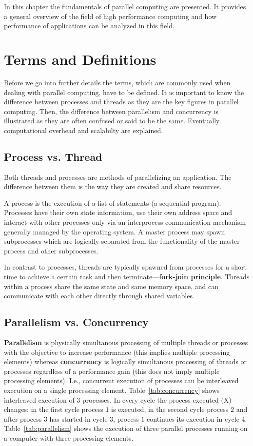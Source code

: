 In this chapter the fundamentals of parallel computing are
presented. It provides a general overview of the field of high
performance computing and how performance of applications can be
analyzed in this field.

\section{Terms and Definitions}
\label{sec:termsdef}

Before we go into further details the terms, which are commonly used
when dealing with parallel computing, have to be
defined. It is important to know the difference between processes
and threads as they are the key figures in parallel computing.
Then, the difference between parallelism and concurrency is illustrated
as they are often confused or said to be the same. Eventually
computational overhead and scalabilty are explained.

\subsection{Process vs. Thread}

Both threads and processes are methods of parallelizing an
application. The difference between them is the way they are
created and share resources.

A process is the execution of a list of statements (a sequential
program). Processes have their own state information, use their own 
address space and interact with other processes only via an
interprocess communication mechanism generally managed by the operating
system. A master process may spawn subprocesses which are logically
separated from the functionality of the master process and other
subprocesses.

In contrast to processes, threads are typically spawned from processes
for a short time to achieve a certain task and then
terminate---\textbf{fork-join principle}. Threads within a process
share the same state and same memory space, and can communicate with
each other directly through shared variables.

\subsection{Parallelism vs. Concurrency}

\textbf{Parallelism} is physically simultanous processing of multiple
threads or processes with the objective
to increase performance (this implies multiple processing elements)
whereas \textbf{concurrency} is logically simultanous processing of
threads or processes regardless of a performance gain (this does not
imply multiple processing elements). I.e., concurrent execution of
processes can be interleaved execution on a single processing
element. Table~\ref{tab:concurrency} shows interleaved execution of 3
processes. In every cycle the process executed (X) changes: in the
first cycle process $1$ is executed, in the second cycle process $2$
and after process $3$ has started in cycle $3$, process $1$ continues
its execution in cycle $4$. Table~\ref{tab:parallelism} shows the
execution of three parallel processes running on a computer with three
processing elements. 

